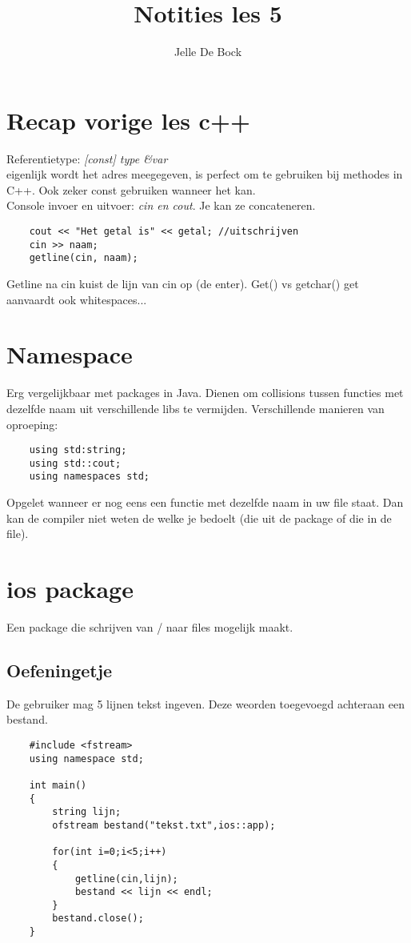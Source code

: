 \documentclass{article}
\title{Notities les 5}
\author{Jelle De Bock}
\begin{document}
\maketitle
\section{Recap vorige les c++}
Referentietype: \textit{[const] type  \&var} \\
eigenlijk wordt het adres meegegeven, is perfect om te gebruiken bij methodes
in C++. Ook zeker const gebruiken wanneer het kan. \\
Console invoer en uitvoer: \textit{cin en cout}. Je kan ze concateneren.
\begin{lstlisting}
    cout << "Het getal is" << getal; //uitschrijven
    cin >> naam;
    getline(cin, naam);
\end{lstlisting}
Getline na cin kuist de lijn van cin op (de enter).
Get() vs getchar() get aanvaardt ook whitespaces...
\section{Namespace}
Erg vergelijkbaar met packages in Java. Dienen om collisions tussen functies
met dezelfde naam uit verschillende libs te vermijden.
Verschillende manieren van oproeping:
\begin{lstlisting}
    using std:string;
    using std::cout;
    using namespaces std;
\end{lstlisting}
Opgelet wanneer er nog eens een functie met dezelfde naam in uw file staat. Dan
kan de compiler niet weten de welke je bedoelt (die uit de package of die in de
file).
\section{ios package}
Een package die schrijven van / naar files mogelijk maakt.
\subsection{Oefeningetje}
De gebruiker mag 5 lijnen tekst ingeven. Deze weorden toegevoegd achteraan een
bestand.

\begin{lstlisting}
    #include <fstream>
    using namespace std;

    int main()
    {
        string lijn;
        ofstream bestand("tekst.txt",ios::app);

        for(int i=0;i<5;i++)
        {
            getline(cin,lijn);
            bestand << lijn << endl;
        }
        bestand.close();
    }   
\end{lstlisting}
\end{document}
